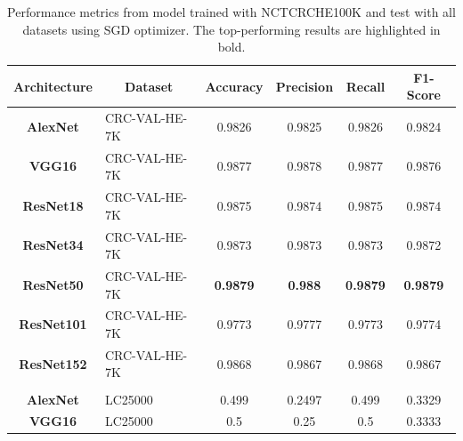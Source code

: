 \begin{table}[t!]
\centering

\caption{Performance metrics from model trained with \gls{NCTCRCHE100K} and test with all datasets using SGD optimizer. The top-performing results are highlighted in bold.}
\label{table_NCTCRCHE100K_sgd}

\begin{tabular}{|c|l|c|c|c|c|}
\hline
\textbf{Architecture}  & \multicolumn{1}{c|}{\textbf{Dataset}} & \textbf{Accuracy}          & \textbf{Precision}    & \textbf{Recall}       & \textbf{F1-Score}     \\ \hline
\textbf{AlexNet}       & CRC-VAL-HE-7K                         & 0.9826                & 0.9825                & 0.9826                & 0.9824                \\ \hline
\textbf{VGG16}         & CRC-VAL-HE-7K                         & 0.9877                & 0.9878                & 0.9877                & 0.9876                \\ \hline
\textbf{ResNet18}      & CRC-VAL-HE-7K                         & 0.9875                & 0.9874                & 0.9875                & 0.9874                \\ \hline
\textbf{ResNet34}      & CRC-VAL-HE-7K                         & 0.9873                & 0.9873                & 0.9873                & 0.9872                \\ \hline
\textbf{ResNet50}      & CRC-VAL-HE-7K                         & \textbf{0.9879}                & \textbf{0.988}                 & \textbf{0.9879}                & \textbf{0.9879}                \\ \hline
\textbf{ResNet101}     & CRC-VAL-HE-7K                         & 0.9773                & 0.9777                & 0.9773                & 0.9774                \\ \hline
\textbf{ResNet152}     & CRC-VAL-HE-7K                         & 0.9868                & 0.9867                & 0.9868                & 0.9867                \\ \hline
\multicolumn{1}{|l|}{} &                                       & \multicolumn{1}{l|}{} & \multicolumn{1}{l|}{} & \multicolumn{1}{l|}{} & \multicolumn{1}{l|}{} \\ \hline
\textbf{AlexNet}       & LC25000                               & 0.499                 & 0.2497                & 0.499                 & 0.3329                \\ \hline
\textbf{VGG16}         & LC25000                               & 0.5                   & 0.25                  & 0.5                   & 0.3333                \\ \hline

\end{tabular}
\end{table}

